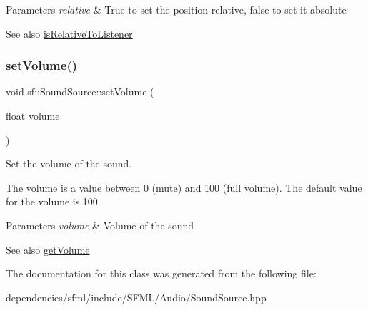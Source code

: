\begin{DoxyParams}{Parameters}
{\em relative} & True to set the position relative, false to set it absolute\\
\hline
\end{DoxyParams}
\begin{DoxySeeAlso}{See also}
\hyperlink{classsf_1_1_sound_source_adcdb4ef32c2f4481d34aff0b5c31534b}{is\+Relative\+To\+Listener} 
\end{DoxySeeAlso}
\mbox{\label{classsf_1_1_sound_source_a2f192f2b49fb8e2b82f3498d3663fcc2}} 
\subsubsection{\texorpdfstring{set\+Volume()}{setVolume()}}
{\footnotesize\ttfamily void sf\+::\+Sound\+Source\+::set\+Volume (\begin{DoxyParamCaption}\item[{float}]{volume }\end{DoxyParamCaption})}



Set the volume of the sound. 

The volume is a value between 0 (mute) and 100 (full volume). The default value for the volume is 100.


\begin{DoxyParams}{Parameters}
{\em volume} & Volume of the sound\\
\hline
\end{DoxyParams}
\begin{DoxySeeAlso}{See also}
\hyperlink{classsf_1_1_sound_source_a04243fb5edf64561689b1d58953fc4ce}{get\+Volume} 
\end{DoxySeeAlso}


The documentation for this class was generated from the following file\+:\begin{DoxyCompactItemize}
\item 
dependencies/sfml/include/\+S\+F\+M\+L/\+Audio/Sound\+Source.\+hpp\end{DoxyCompactItemize}
